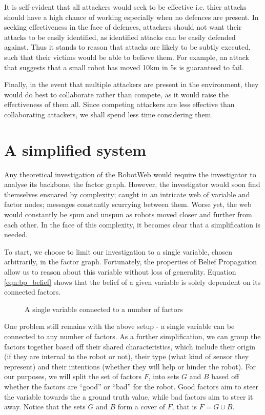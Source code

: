 It is self-evident that all attackers would seek to be effective i.e. thier attacks should have a high chance of working especially when no defences are present. In seeking effectiveness in the face of defences, attackers should not want their attacks to be easily identified, as identified attacks can be easily defended against. Thus it stands to reason that attacks are likely to be subtly executed, such that their victims would be able to believe them. For example, an attack that suggests that a small robot has moved 10km in 5s is guaranteed to fail.

Finally, in the event that multiple attackers are present in the environment, they would do best to collaborate rather than compete, as it would raise the effectiveness of them all. Since competing attackers are less effective than collaborating attackers, we shall spend less time considering them.

\section{A simplified system}
Any theoretical investigation of the RobotWeb would require the investigator to analyse its backbone, the factor graph. However, the investigator would soon find themselves ensnared by complexity; caught in an intricate web of variable and factor nodes; messages constantly scurrying between them. Worse yet, the web would constantly be spun and unspun as robots moved closer and further from each other.
In the face of this complexity, it becomes clear that a simplification is needed.

To start, we choose to limit our investigation to a single variable, chosen arbitrarily, in the factor graph. Fortunately, the properties of Belief Propagation allow us to reason about this variable without loss of generality. Equation \ref{eqn:bp_belief} shows that the belief of a given variable is solely dependent on its connected factors. 

\begin{figure}[!h]
	\centering
	

	\caption[Single Variable in a Factor Graph]{A single variable connected to a number of factors}
\end{figure}

One problem still remains with the above setup - a single variable can be connected to any number of factors. As a further simplification, we can group the factors together based off their shared characteristics, which include their origin (if they are internal to the robot or not), their type (what kind of sensor they represent) and their intentions (whether they will help or hinder the robot). For our purposes, we will split the set of factors $F$, into sets $G$ and $B$ based off whether the factors are ``good'' or ``bad'' for the robot. Good factors aim to steer the variable towards the a ground truth value, while bad factors aim to steer it away. Notice that the sets $G$ and $B$ form a cover of $F$, that is $F = G \cup B$.

